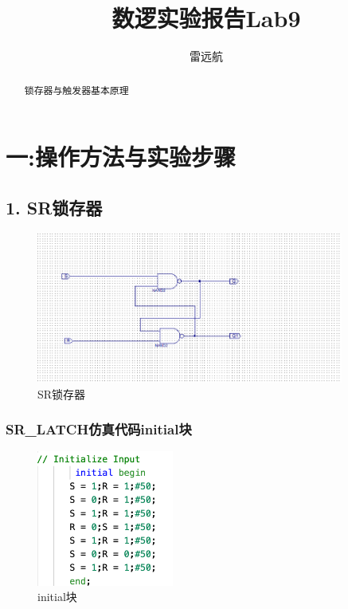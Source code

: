 \documentclass{article}
\title{数逻实验报告Lab9}
\author{雷远航}
\begin{document}
\maketitle

\begin{abstract}
    锁存器与触发器基本原理
\end{abstract}


\section*{一:操作方法与实验步骤}

\subsection*{1. SR锁存器}
    \begin{figure}[H]
    \centering
    \includegraphics[width=0.9\textwidth]{lab9p/5.png}
    \caption{\label{Lab9}SR锁存器}
    \end{figure}
\subsubsection*{SR\_LATCH仿真代码initial块}
    \begin{figure}[H]
    \centering
    \includegraphics[width=0.4\textwidth]{lab9p/11.png}
    \caption{\label{Lab9}initial块}
    \end{figure}
\end{document}
